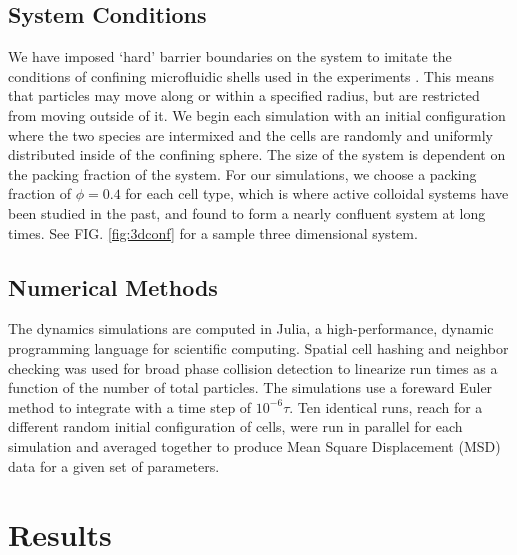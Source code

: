 \documentclass[aps,prb,twocolumn,groupedaddress,nofootinbib,floatfix]{revtex4}
\begin{document}

\subsection*{System Conditions}
We have imposed `hard' barrier boundaries on the system to imitate the conditions of confining microfluidic shells used in the experiments \cite{Mingming}. 
This means that particles may move along or within a specified radius, but are restricted from moving outside of it. We begin each simulation with an initial configuration 
where the two species are intermixed and the cells are randomly and uniformly distributed inside of the confining sphere. The size of the system is dependent on the 
packing fraction of the system. For our simulations, we choose a packing fraction of $\phi=0.4$ for each cell type, which is where active colloidal systems have been 
studied in the past\cite{RednerBaskaran}, and found to form a nearly confluent system at long times. See FIG. \ref{fig:3dconf} for a sample three dimensional system.


\subsection*{Numerical Methods}

The dynamics simulations are computed in Julia, a high-performance, dynamic 
programming language for scientific computing. Spatial cell hashing and neighbor 
checking was used for broad phase collision detection to linearize run times 
as a function of the number of total particles. The simulations use a foreward 
Euler method to integrate with a time step of $10^{-6}\tau$. 
Ten identical runs, reach for a different random initial configuration of cells, were run in parallel for each simulation
and averaged together to produce Mean Square Displacement (MSD) data for a given set of parameters.

\section*{Results}
\end{document}
